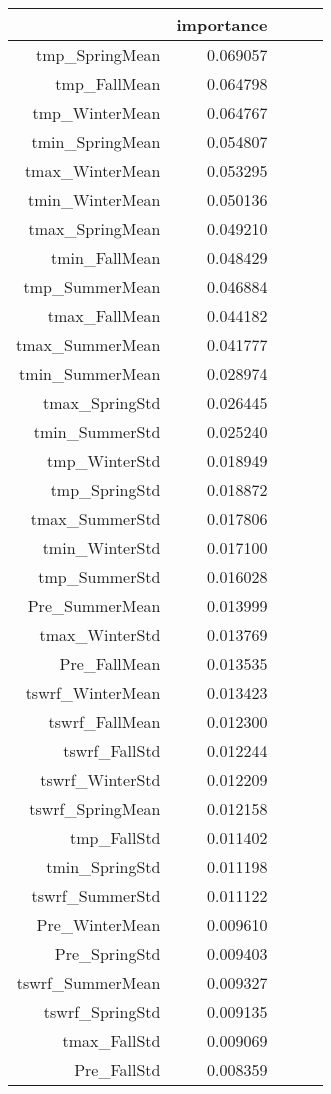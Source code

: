 \begin{tabular}{rrrrr}
\toprule
 & importance \\
\midrule
tmp_SpringMean & 0.069057 \\
tmp_FallMean & 0.064798 \\
tmp_WinterMean & 0.064767 \\
tmin_SpringMean & 0.054807 \\
tmax_WinterMean & 0.053295 \\
tmin_WinterMean & 0.050136 \\
tmax_SpringMean & 0.049210 \\
tmin_FallMean & 0.048429 \\
tmp_SummerMean & 0.046884 \\
tmax_FallMean & 0.044182 \\
tmax_SummerMean & 0.041777 \\
tmin_SummerMean & 0.028974 \\
tmax_SpringStd & 0.026445 \\
tmin_SummerStd & 0.025240 \\
tmp_WinterStd & 0.018949 \\
tmp_SpringStd & 0.018872 \\
tmax_SummerStd & 0.017806 \\
tmin_WinterStd & 0.017100 \\
tmp_SummerStd & 0.016028 \\
Pre_SummerMean & 0.013999 \\
tmax_WinterStd & 0.013769 \\
Pre_FallMean & 0.013535 \\
tswrf_WinterMean & 0.013423 \\
tswrf_FallMean & 0.012300 \\
tswrf_FallStd & 0.012244 \\
tswrf_WinterStd & 0.012209 \\
tswrf_SpringMean & 0.012158 \\
tmp_FallStd & 0.011402 \\
tmin_SpringStd & 0.011198 \\
tswrf_SummerStd & 0.011122 \\
Pre_WinterMean & 0.009610 \\
Pre_SpringStd & 0.009403 \\
tswrf_SummerMean & 0.009327 \\
tswrf_SpringStd & 0.009135 \\
tmax_FallStd & 0.009069 \\
Pre_FallStd & 0.008359 \\

\end{tabular}
